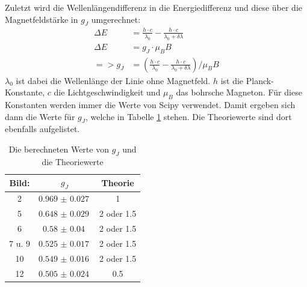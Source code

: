 \documentclass[
  bibliography=totoc,     %
  captions=tableheading,  %
  titlepage=firstiscover, %
]{scrartcl}
\begin{document}
\noindent
Zuletzt wird die Wellenlängendifferenz in die Energiedifferenz und
diese über die Magnetfeldstärke in $g_J$ umgerechnet:
\begin{align}
  \Delta E &= \frac{h \cdot c}{\lambda_0}-\frac{h \cdot c}{\lambda_0+\delta\lambda}\\
  \Delta E &= g_J \cdot \mu_B B\\
  => g_J &= \left(\frac{h \cdot c}{\lambda_0}-\frac{h \cdot c}{\lambda_0+\delta\lambda}\right) / \mu_B B
\end{align}
$\lambda_0$ ist dabei die Wellenlänge der Linie ohne Magnetfeld. $h$ ist die Planck-Konstante, $c$ die Lichtgeschwindigkeit
und $\mu_B$ das bohrsche Magneton. Für diese Konstanten werden immer die Werte von Scipy \cite{scipy} verwendet.
Damit ergeben sich dann die Werte für $g_J$, welche in Tabelle \ref{tab:gjergebnisse} stehen.
Die Theoriewerte sind dort ebenfalls aufgelistet.
\begin{table}[H]
  \centering
  \caption{Die berechneten Werte von $g_J$ und die Theoriewerte}
  \label{tab:gjergebnisse}
  \begin{tabular}{c c c}
    \toprule
    Bild: & $g_J$ & Theorie \\
    \midrule
    2 & $\SI{0.969(27)}{}$ & 1 \\
    5 & $\SI{0.648(29)}{}$ & 2 oder 1.5 \\
    6 & $\SI{0.58(4)}{}$ & 2 oder 1.5 \\
    7 u. 9 & $\SI{0.525(17)}{}$ & 2 oder 1.5 \\
    10 & $\SI{0.549(16)}{}$ & 2 oder 1.5 \\
    12 & $\SI{0.505(24)}{}$ & 0.5 \\
    \bottomrule
  \end{tabular}
\end{table}
\end{document}
